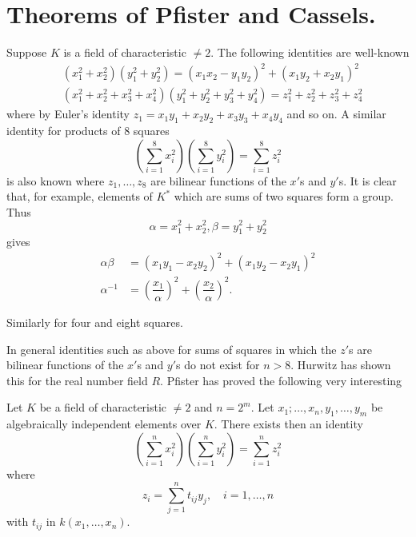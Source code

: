 \section{Theorems of Pfister and Cassels.}\label{s3}

Suppose $K$ is a field of characteristic $\neq 2$. The following
identities are well-known
\begin{align*}
&\left(x^{2}_1+x^{2}_2\right)\left(y^{2}_1+y^{2}_2\right)=(x_1x_2-y_1y_2)^{2}+(x_1y_2+x_2y_1)^{2}\\
&\left(x^{2}_1+x^{2}_2+x^{2}_3+x^{2}_4\right)\left(y^{2}_1+y^{2}_2+y^{2}_3+y^{2}_4\right)=z^{2}_1+z^{2}_2+z^{2}_3+z^{2}_4
\end{align*}
where by Euler's identity $z_1=x_1y_1+x_2y_2+x_3y_3+x_4y_4$ and so
on. A similar identity for products of $8$ squares
$$
\left(\sum\limits_{i=1}^{8} x^{2}_i\right) \left(\sum\limits_{i=1}^{8} y^{2}_i\right)=\sum\limits_{i=1}^{8}z^{2}_i
$$
is also known where $z_1,\ldots, z_8$ are bilinear functions of the
$x'$s and $y'$s. It is clear that, for example, elements of $K^{\ast}$
which are sums of two squares form a group. Thus 
$$
\alpha=x^{2}_1+x^{2}_2, \beta=y^{2}_1+y^{2}_2
$$
gives
\begin{align*}
\alpha\beta&=(x_1y_1-x_2y_2)^{2}+(x_1y_2-x_2y_1)^{2}\\
\alpha^{-1}&=
\left(\dfrac{x_1}{\alpha}\right)^{2}+\left(\dfrac{x_2}{\alpha}\right)^{2}.
\end{align*}

Similarly for four and eight squares.

In general identities such as above for sums of squares in which the
$z'$s are bilinear functions of the $x'$s and $y'$s do not exist for
$n>8$. Hurwitz has shown this for the real number field $R$. Pfister
\cite{key15} has proved the following very interesting 

\begin{thm}\label{thm5}
Let $K$ be a field of characteristic $\neq 2$ and $n=2^{m}.$ Let
$x_1;\ldots,x_n, y_1,\ldots,y_m$ be algebraically independent elements
over $K$. \break There exists then an identity
$$
\left(\sum\limits_{i=1}^{n}x^{2}_i\right)\left(\sum\limits_{i=1}^{n}y^{2}_i\right)=\sum\limits_{i=1}^{n}z^{2}_i
$$
where
$$
z_i=\sum\limits_{j=1}^{n}t_{ij}y_j,\quad i=1,\ldots,n
$$
with $t_{ij}$ in $k(x_1,\ldots,x_n)$.
\end{thm}

